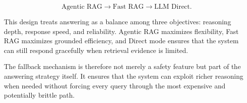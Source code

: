 \begin{equation}
\text{Agentic RAG} \rightarrow \text{Fast RAG} \rightarrow \text{LLM Direct}.
\end{equation}

This design treats answering as a balance among three objectives: reasoning depth, response speed, and reliability. Agentic RAG maximizes flexibility, Fast RAG maximizes grounded efficiency, and Direct mode ensures that the system can still respond gracefully when retrieval evidence is limited.

The fallback mechanism is therefore not merely a safety feature but part of the answering strategy itself. It ensures that the system can exploit richer reasoning when needed without forcing every query through the most expensive and potentially brittle path.
